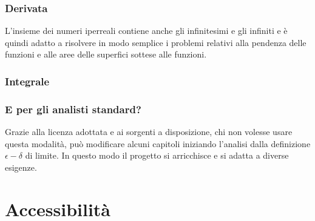 \documentclass{beamer} %
\begin{document}
\begin{frame}\frametitle{Derivata}

L'insieme dei numeri iperreali contiene anche gli infinitesimi e gli 
infiniti e è quindi adatto a risolvere in modo semplice i problemi relativi 
alla pendenza delle funzioni e alle aree delle superfici sottese alle 
funzioni.

\pause
\begin{center}

\end{center}

\end{frame}


\begin{frame}\frametitle{Integrale}

\begin{center}
\end{center}


\end{frame}


\begin{frame}\frametitle{E per gli analisti standard?}

Grazie alla licenza adottata e ai sorgenti a disposizione,
\spause
chi non volesse usare questa modalità, può modificare 
alcuni capitoli iniziando l'analisi dalla definizione \(\epsilon - \delta\) 
di limite.
\spause
In questo modo il progetto si arricchisce e si adatta a diverse esigenze.
\end{frame}


\section{Accessibilità}
\end{document}
